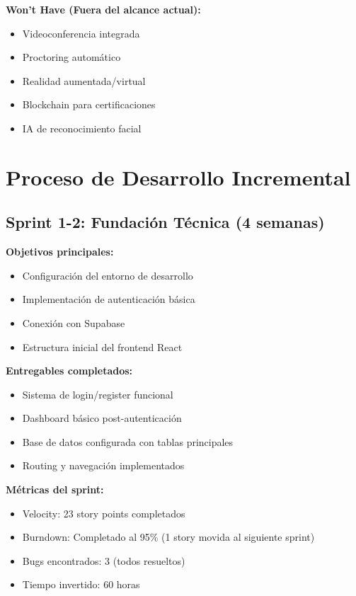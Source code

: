 \documentclass[12pt,a4paper]{report}
\begin{document}
\textbf{Won't Have (Fuera del alcance actual):}
\begin{itemize}
\item Videoconferencia integrada
\item Proctoring automático
\item Realidad aumentada/virtual
\item Blockchain para certificaciones
\item IA de reconocimiento facial
\end{itemize}

\section{Proceso de Desarrollo Incremental}

\subsection{Sprint 1-2: Fundación Técnica (4 semanas)}

\textbf{Objetivos principales:}
\begin{itemize}
\item Configuración del entorno de desarrollo
\item Implementación de autenticación básica
\item Conexión con Supabase
\item Estructura inicial del frontend React
\end{itemize}

\textbf{Entregables completados:}
\begin{itemize}
\item Sistema de login/register funcional
\item Dashboard básico post-autenticación
\item Base de datos configurada con tablas principales
\item Routing y navegación implementados
\end{itemize}

\textbf{Métricas del sprint:}
\begin{itemize}
\item Velocity: 23 story points completados
\item Burndown: Completado al 95\% (1 story movida al siguiente sprint)
\item Bugs encontrados: 3 (todos resueltos)
\item Tiempo invertido: 60 horas
\end{itemize}
\end{document}
